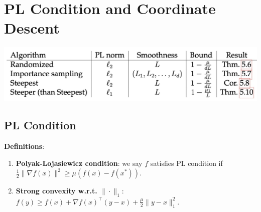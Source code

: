 \section{PL Condition and Coordinate Descent}

\includegraphics[width=\linewidth]{imgs/CGD.jpg}

\subsection{PL Condition}

\textbf{Definitions}:
\begin{enumerate}
    \item \textbf{Polyak-Lojasiewicz condition}: we say $f$ satisfies PL condition if $\frac{1}{2}\|\nabla f(x)\|^2 \ge \mu (f(x) - f(x^*))$.
    \item \textbf{Strong convexity w.r.t. $\|\cdot\|_1$}: $f(y) \ge f(x) + \nabla f(x)^\top (y-x) + \frac{\mu}{2}\|y-x\|_1^2$.
\end{enumerate}

